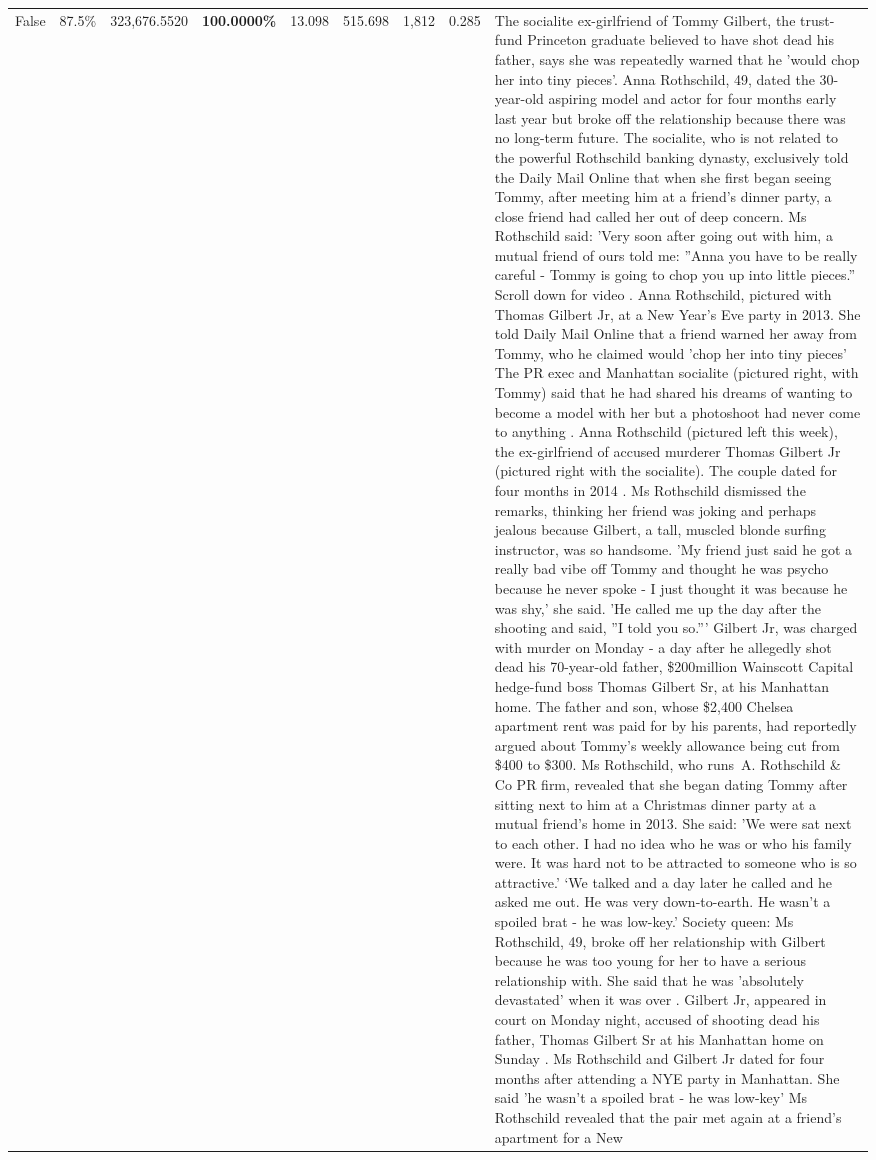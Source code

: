 \begin{table}[H]
\begin{tabular}{lllrlllll}
False & 87.5\% & 323,676.5520 & \bfseries \color{red} 100.0000\% & 13.098 & 515.698 & 1,812 & 0.285 & The socialite ex-girlfriend of Tommy Gilbert, the trust-fund Princeton graduate believed to have shot dead his father, says she was repeatedly warned that he 'would chop her into tiny pieces'. Anna Rothschild, 49, dated the 30-year-old aspiring model and actor for four months early last year but broke off the relationship because there was no long-term future. The socialite, who is not related to the powerful Rothschild banking dynasty, exclusively told the Daily Mail Online that when she first began seeing Tommy, after meeting him at a friend's dinner party, a close friend had called her out of deep concern. Ms Rothschild said: 'Very soon after going out with him, a mutual friend of ours told me: ''Anna you have to be really careful - Tommy is going to chop you up into little pieces.'' Scroll down for video . Anna Rothschild, pictured with Thomas Gilbert Jr, at a New Year's Eve party in 2013. She told Daily Mail Online that a friend warned her away from Tommy, who he claimed would 'chop her into tiny pieces' The PR exec and Manhattan socialite (pictured right, with Tommy) said that he had shared his dreams of wanting to become a model with her but a photoshoot had never come to anything . Anna Rothschild (pictured left this week), the ex-girlfriend of accused murderer Thomas Gilbert Jr (pictured right with the socialite). The couple dated for four months in 2014 . Ms Rothschild dismissed the remarks, thinking her friend was joking and perhaps jealous because Gilbert, a tall, muscled blonde surfing instructor, was so handsome. 'My friend just said he got a really bad vibe off Tommy and thought he was psycho because he never spoke - I just thought it was because he was shy,' she said. 'He called me up the day after the shooting and said, ''I told you so.''' Gilbert Jr, was charged with murder on Monday - a day after he allegedly shot dead his 70-year-old father, \$200million Wainscott Capital hedge-fund boss Thomas Gilbert Sr, at his Manhattan home. The father and son, whose \$2,400 Chelsea apartment rent was paid for by his parents, had reportedly argued about Tommy's weekly allowance being cut from \$400 to \$300. Ms Rothschild, who runs A. Rothschild \& Co PR firm, revealed that she began dating Tommy after sitting next to him at a Christmas dinner party at a mutual friend's home in 2013. She said: 'We were sat next to each other. I had no idea who he was or who his family were. It was hard not to be attracted to someone who is so attractive.' ‘We talked and a day later he called and he asked me out. He was very down-to-earth. He wasn’t a spoiled brat - he was low-key.’ Society queen: Ms Rothschild, 49, broke off her relationship with Gilbert because he was too young for her to have a serious relationship with. She said that he was 'absolutely devastated' when it was over . Gilbert Jr, appeared in court on Monday night, accused of shooting dead his father, Thomas Gilbert Sr at his Manhattan home on Sunday . Ms Rothschild and Gilbert Jr dated for four months after attending a NYE party in Manhattan. She said 'he wasn't a spoiled brat - he was low-key' Ms Rothschild revealed that the pair met again at a friend’s apartment for a New 
\end{tabular}
\end{table}
